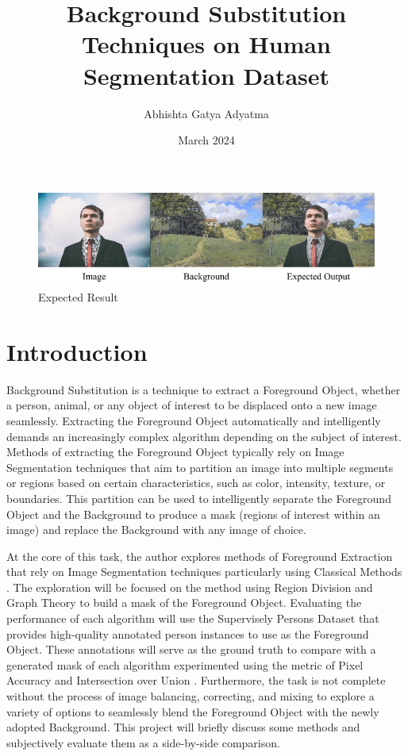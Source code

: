 \documentclass{article}
\title{Background Substitution Techniques on Human Segmentation Dataset}
\author{Abhishta Gatya Adyatma}
\date{March 2024}
\begin{document}
\maketitle

\begin{figure}[htbp]
    \centering
    \includegraphics[width=0.9\linewidth]{img/Expect.jpg}
    \caption{Expected Result}
    \label{fig:problemi}
\end{figure}

\section{Introduction}

Background Substitution is a technique to extract a Foreground Object, whether a person, animal, or any object of interest to be displaced onto a new image seamlessly. Extracting the Foreground Object automatically and intelligently demands an increasingly complex algorithm depending on the subject of interest. Methods of extracting the Foreground Object typically rely on Image Segmentation techniques that aim to partition an image into multiple segments or regions based on certain characteristics, such as color, intensity, texture, or boundaries. This partition can be used to intelligently separate the Foreground Object and the Background to produce a mask (regions of interest within an image) and replace the Background with any image of choice.

At the core of this task, the author explores methods of Foreground Extraction that rely on Image Segmentation techniques particularly using Classical Methods \cite{ImageSegmentation2023}. The exploration will be focused on the method using Region Division and Graph Theory to build a mask of the Foreground Object. Evaluating the performance of each algorithm will use the Supervisely Persons Dataset \cite{SuperviselyPersons} that provides high-quality annotated person instances to use as the Foreground Object. These annotations will serve as the ground truth to compare with a generated mask of each algorithm experimented using the metric of Pixel Accuracy and Intersection over Union \cite{IoU}. Furthermore, the task is not complete without the process of image balancing, correcting, and mixing to explore a variety of options to seamlessly blend the Foreground Object with the newly adopted Background. This project will briefly discuss some methods and subjectively evaluate them as a side-by-side comparison.
\end{document}
